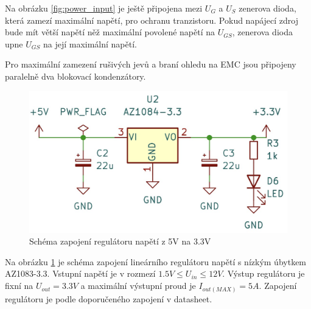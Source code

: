 Na obrázku \ref{fig:power_input} je ještě připojena mezi $U_G$ a $U_S$ zenerova dioda, která zamezí maximální napětí, pro ochranu tranzistoru. Pokud napájecí zdroj bude mít větší napětí něž maximální povolené napětí na $U_{GS}$, zenerova dioda upne $U_{GS}$ na její maximální napětí.
\par
Pro maximální zamezení rušivých jevů a braní ohledu na EMC jsou připojeny paralelně dva blokovací kondenzátory.

\begin{figure}[H]
\includegraphics[width=0.9\linewidth]{pictures/ldo_3v3.jpg}
\caption{Schéma zapojení regulátoru napětí z 5V na 3.3V}
\label{fig:stepdown}
\end{figure}
Na obrázku \ref{fig:stepdown} je schéma zapojení lineárního regulátoru napětí s nízkým úbytkem AZ1083-3.3. Vstupní napětí je v rozmezí $1.5V \leq U_{in} \leq 12V $. Výstup regulátoru je fixní na $U_{out} = 3.3V$ a maximální výstupní proud je $I_{out(MAX)} = 5A$. Zapojení regulátoru je podle doporučeného zapojení v datasheet.
